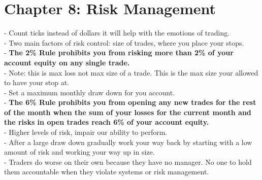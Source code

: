 \documentclass[12pt,fullpage]{article}
\begin{document}
\section*{Chapter 8: Risk Management}
- Count ticks instead of dollars it will help with the emotions of trading.\\
- Two main factors of risk control: size of trades, where you place your stops.\\
- \textbf{The 2\% Rule prohibits you from risking more than 2\% of your account equity on any single trade.}\\
- Note: this is max loss not max size of a trade. This is the max size your allowed to have your stop at.\\
- Set a maximum monthly draw down for you account.\\
- \textbf{The 6\% Rule prohibits you from opening any new trades for the rest of the month when the sum of your losses for the current month and the risks in open trades reach 6\% of your account equity.}\\
- Higher levels of risk, impair our ability to perform.\\
- After a large draw down gradually work your way back by starting with a low amount of risk and working your way up in size.\\
- Traders do worse on their own because they have no manager. No one to hold them accountable when they violate systems or risk management.\\
\end{document}
